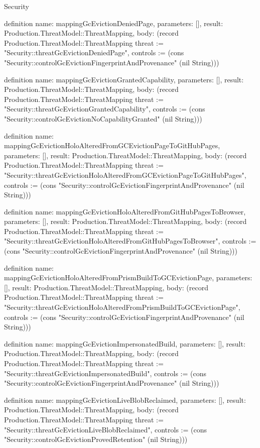 \begin{lexlean}{Security}
\begin{semanticmodule}
definition{
  name: mappingGcEvictionDeniedPage,
  parameters: [],
  result: Production.ThreatModel::ThreatMapping,
  body: (record Production.ThreatModel::ThreatMapping {threat := "Security::threatGcEvictionDeniedPage", controls := (cons "Security::controlGcEvictionFingerprintAndProvenance" (nil String))})
}

definition{
  name: mappingGcEvictionGrantedCapability,
  parameters: [],
  result: Production.ThreatModel::ThreatMapping,
  body: (record Production.ThreatModel::ThreatMapping {threat := "Security::threatGcEvictionGrantedCapability", controls := (cons "Security::controlGcEvictionNoCapabilityGranted" (nil String))})
}

definition{
  name: mappingGcEvictionHoloAlteredFromGCEvictionPageToGitHubPages,
  parameters: [],
  result: Production.ThreatModel::ThreatMapping,
  body: (record Production.ThreatModel::ThreatMapping {threat := "Security::threatGcEvictionHoloAlteredFromGCEvictionPageToGitHubPages", controls := (cons "Security::controlGcEvictionFingerprintAndProvenance" (nil String))})
}

definition{
  name: mappingGcEvictionHoloAlteredFromGitHubPagesToBrowser,
  parameters: [],
  result: Production.ThreatModel::ThreatMapping,
  body: (record Production.ThreatModel::ThreatMapping {threat := "Security::threatGcEvictionHoloAlteredFromGitHubPagesToBrowser", controls := (cons "Security::controlGcEvictionFingerprintAndProvenance" (nil String))})
}

definition{
  name: mappingGcEvictionHoloAlteredFromPrismBuildToGCEvictionPage,
  parameters: [],
  result: Production.ThreatModel::ThreatMapping,
  body: (record Production.ThreatModel::ThreatMapping {threat := "Security::threatGcEvictionHoloAlteredFromPrismBuildToGCEvictionPage", controls := (cons "Security::controlGcEvictionFingerprintAndProvenance" (nil String))})
}

definition{
  name: mappingGcEvictionImpersonatedBuild,
  parameters: [],
  result: Production.ThreatModel::ThreatMapping,
  body: (record Production.ThreatModel::ThreatMapping {threat := "Security::threatGcEvictionImpersonatedBuild", controls := (cons "Security::controlGcEvictionFingerprintAndProvenance" (nil String))})
}

definition{
  name: mappingGcEvictionLiveBlobReclaimed,
  parameters: [],
  result: Production.ThreatModel::ThreatMapping,
  body: (record Production.ThreatModel::ThreatMapping {threat := "Security::threatGcEvictionLiveBlobReclaimed", controls := (cons "Security::controlGcEvictionProvedRetention" (nil String))})
}


\end{semanticmodule}
\end{lexlean}

